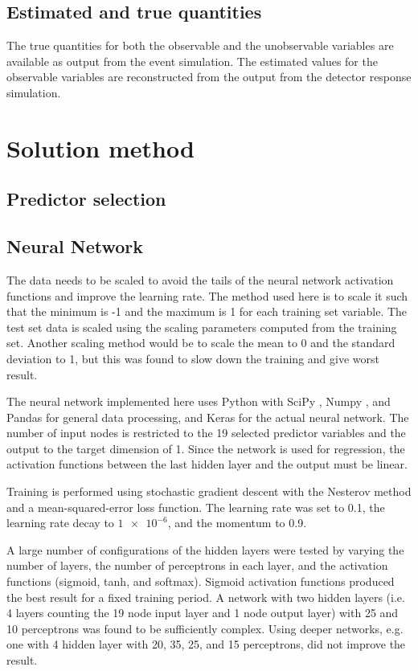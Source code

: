 \documentclass{scrartcl}
\begin{document}
\subsection{Estimated and true quantities}
The true quantities for both the observable and the unobservable variables are available as output from the event simulation. The estimated values for the observable variables are reconstructed from the output from the detector response simulation.

\section{Solution method}

\subsection{Predictor selection}

\subsection{Neural Network}

The data needs to be scaled to avoid the tails of the neural network activation functions and improve the learning rate. The method used here is to scale it such that the minimum is -1 and the maximum is 1 for each training set variable. The test set data is scaled using the scaling parameters computed from the training set. Another scaling method would be to scale the mean to 0 and the standard deviation to 1, but this was found to slow down the training and give worst result.

The neural network implemented here uses Python with SciPy \cite{scipy}, Numpy \cite{numpy}, and Pandas \cite{pandas} for general data processing, and Keras \cite{keras} for the actual neural network. The number of input nodes is restricted to the 19 selected predictor variables and the output to the target dimension of 1. Since the network is used for regression, the activation functions between the last hidden layer and the output must be linear.

Training is performed using stochastic gradient descent with the Nesterov method \cite{nesterov} and a mean-squared-error loss function. The learning rate was set to 0.1, the learning rate decay to $\num{1e-6}$, and the momentum to 0.9.

A large number of configurations of the hidden layers were tested by varying the number of layers, the number of perceptrons in each layer, and the activation functions (sigmoid, tanh, and softmax). Sigmoid activation functions produced the best result for a fixed training period. A network with two hidden layers (i.e. 4 layers counting the 19 node input layer and 1 node output layer) with 25 and 10 perceptrons was found to be sufficiently complex. Using deeper networks, e.g. one with 4 hidden layer with 20, 35, 25, and 15 perceptrons, did not improve the result.
\end{document}
